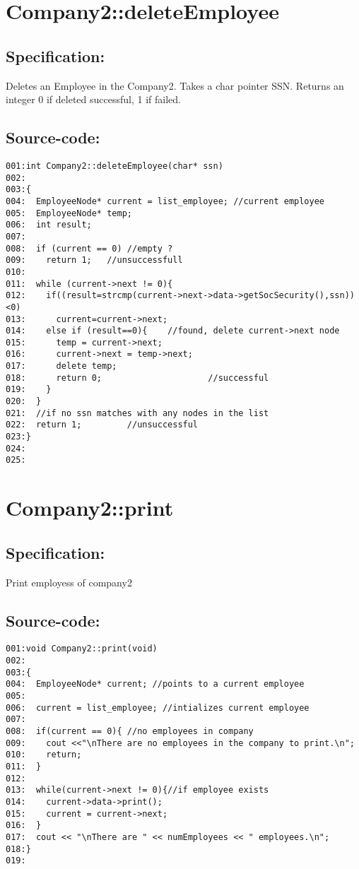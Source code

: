 \section{Company2::deleteEmployee}
\subsection*{Specification:}
Deletes an Employee in the Company2.
  Takes a char pointer SSN.
  Returns an integer 0 if deleted successful, 1 if failed.
\subsection*{Source-code:}
\begin{verbatim}
001:int Company2::deleteEmployee(char* ssn)
002:       
003:{
004:  EmployeeNode* current = list_employee; //current employee
005:  EmployeeNode* temp;
006:  int result;
007:
008:  if (current == 0) //empty ?
009:    return 1;   //unsuccessfull
010:
011:  while (current->next != 0){
012:    if((result=strcmp(current->next->data->getSocSecurity(),ssn))<0)
013:      current=current->next;
014:    else if (result==0){    //found, delete current->next node
015:      temp = current->next;
016:      current->next = temp->next;
017:      delete temp;
018:      return 0;                     //successful
019:    }
020:  }
021:  //if no ssn matches with any nodes in the list
022:  return 1;         //unsuccessful
023:}
024:
025:
\end{verbatim}
\section{Company2::print}
\subsection*{Specification:}
Print employess of company2
\subsection*{Source-code:}
\begin{verbatim}
001:void Company2::print(void)
002:
003:{
004:  EmployeeNode* current; //points to a current employee
005:  
006:  current = list_employee; //intializes current employee
007:
008:  if(current == 0){ //no employees in company
009:    cout <<"\nThere are no employees in the company to print.\n";
010:    return;
011:  }
012:
013:  while(current->next != 0){//if employee exists
014:    current->data->print();
015:    current = current->next;
016:  }
017:  cout << "\nThere are " << numEmployees << " employees.\n";
018:}
019:
\end{verbatim}

